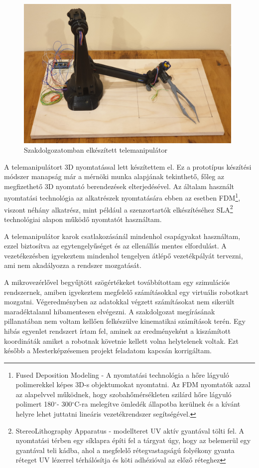 \begin{figure}[!ht]
\centering
\includegraphics[width=110mm, keepaspectratio]{figures/Szakdoga/0_v_4_csipeszes}
\caption{Szakdolgozatomban elkészített telemanipulátor}
\label{fig:Szakdoga_csipeszes}
\end{figure}

A telemanipulátort 3D nyomtatással lett készítettem el. Ez a prototípus készítési módszer manapság már a mérnöki munka alapjának tekinthető, főleg az megfizethető 3D nyomtató berendezések elterjedésével. Az általam használt nyomtatási technológia az alkatrészek nyomtatására ebben az esetben FDM\footnote{Fused Deposition Modeling - A nyomtatási technológia a hőre lágyuló polimerekkel képes 3D-s objektumokat nyomtatni. Az FDM nyomtatók azzal az alapelvvel működnek, hogy szobahőmérsékleten szilárd hőre lágyuló polimert 180$^{\circ}$- 300$^{\circ}$C-ra melegítve ömledék állapotba kerülnek és a kívánt helyre lehet juttatni lineáris vezetékrendszer segítségével.}, viszont néhány alkatrész, mint például a szenzortartók elkészítéséhez SLA\footnote{StereoLithography Apparatus - modellteret UV aktív gyantával tölti fel. A nyomtatási térben egy síklapra építi fel a tárgyat úgy, hogy az belemerül egy gyantával teli kádba, ahol a megfelelő rétegvastagságú folyékony gyanta réteget UV lézerrel térhálósítja és köti adhézióval az előző réteghez} technológiai alapon működő nyomtatót használtam. 

A telemanipulátor karok csatlakozásánál mindenhol csapágyakat használtam, ezzel biztosítva az egytengelyűséget és az ellenállás mentes elfordulást. A vezetékezésben igyekeztem mindenhol tengelyen átlépő vezetékpályát tervezni, ami nem akadályozza a rendszer mozgatását.

A mikrovezérlővel begyűjtött szögértékeket továbbítottam egy szimulációs rendszernek, amiben igyekeztem megfelelő számításokkal egy virtuális robotkart mozgatni. Végeredményben az adatokkal végzett számításokat nem sikerült maradéktalanul hibamentesen elvégezni. A szakdolgozat megírásának pillanatában nem voltam kellően felkészülve kinematikai számítások terén. Egy hibás egyenlet rendszert írtam fel, aminek az eredményeként a kiszámított koordináták amiket a robotnak követnie kellett volna helytelenek voltak. Ezt később a Mesterképzésemen projekt feladatom kapcsán korrigáltam.

